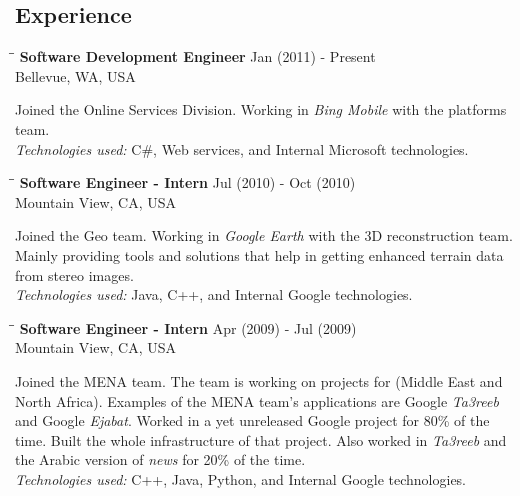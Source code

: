 \documentclass{res}
\begin{document}
\begin{resume}
\section{Experience}
   \vspace{-0.1in}
   \begin{tabbing}
   \hspace{2.3in}\= \hspace{2.3in}\= \kill %
    {\bf Software Development Engineer}\> \hfill Jan (2011) - Present\\
                                    \>Bellevue, WA, USA
   \end{tabbing}\vspace{-20pt}      %
    Joined the Online Services Division. Working in {\sl Bing Mobile} with the platforms team.\\
    {\sl Technologies used:} C\#, Web services, and Internal Microsoft technologies.

   \begin{tabbing}
   \hspace{2.3in}\= \hspace{2.3in}\= \kill %
    {\bf Software Engineer - Intern}\> \hfill Jul (2010) - Oct (2010)\\
                                    \>Mountain View, CA, USA
   \end{tabbing}\vspace{-20pt}      %
    Joined the Geo team. Working in {\sl Google Earth} with the 3D reconstruction team.
    Mainly providing tools and solutions that help in getting enhanced terrain data from stereo images.\\
    {\sl Technologies used:} Java, C++, and Internal Google technologies.

   \begin{tabbing}
   \hspace{2.3in}\= \hspace{2.3in}\= \kill %
    {\bf Software Engineer - Intern}\> \hfill Apr (2009) - Jul (2009)\\
                                    \>Mountain View, CA, USA
   \end{tabbing}\vspace{-20pt}      %
    Joined the MENA team. The team is working on projects for (Middle East and North Africa). Examples of
    the MENA team's applications are Google {\sl Ta3reeb} and Google {\sl Ejabat}. Worked in a yet unreleased
    Google project for 80\% of the time. Built the whole infrastructure of that project. Also worked
    in {\sl Ta3reeb} and the Arabic version of {\sl news} for 20\% of the time.\\
    {\sl Technologies used:} C++, Java, Python, and Internal Google technologies.


\end{resume}
\end{document}
